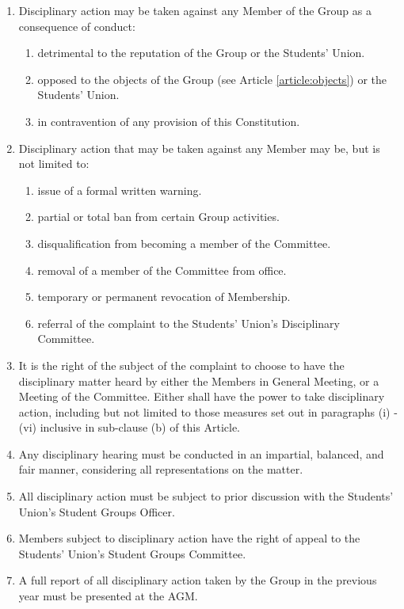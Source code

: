 \documentclass[12pt]{constitution}
\begin{document}
\begin{enumerate}
    \item Disciplinary action may be taken against any Member of the Group as a consequence of conduct:
    \begin{enumerate}
        \item detrimental to the reputation of the Group or the Students' Union.
        \item opposed to the objects of the Group (see Article \ref{article:objects}) or the Students' Union.
        \item in contravention of any provision of this Constitution.
    \end{enumerate}
    \item Disciplinary action that may be taken against any Member may be, but is not limited to:
    \begin{enumerate}
        \item issue of a formal written warning.
        \item partial or total ban from certain Group activities.
        \item disqualification from becoming a member of the Committee.
        \item removal of a member of the Committee from office.
        \item temporary or permanent revocation of Membership.
        \item referral of the complaint to the Students' Union's Disciplinary Committee.
    \end{enumerate}

    \item It is the right of the subject of the complaint to choose to have the disciplinary matter heard by either the Members in General Meeting, or a Meeting of the Committee.  Either shall have the power to take disciplinary action, including but not limited to those measures set out in paragraphs (i) - (vi) inclusive in sub-clause (b) of this Article.

    \item Any disciplinary hearing must be conducted in an impartial, balanced, and fair manner, considering all representations on the matter.

    \item All disciplinary action must be subject to prior discussion with the Students' Union's Student Groups Officer.

    \item Members subject to disciplinary action have the right of appeal to the Students' Union's Student Groups Committee.

    \item A full report of all disciplinary action taken by the Group in the previous year must be presented at the AGM.
\end{enumerate}
\end{document}
